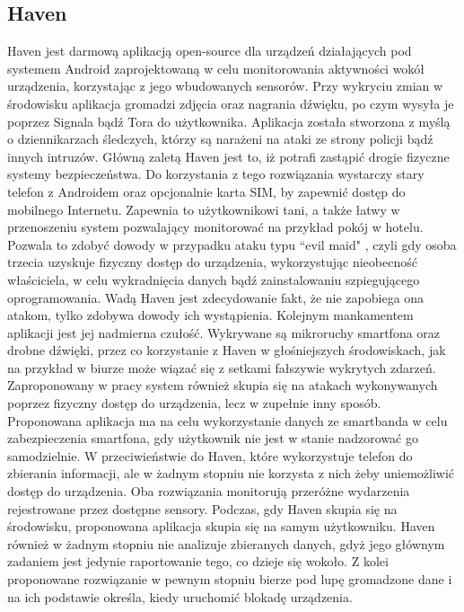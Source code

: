 \subsection{Haven}
Haven \cite{Haven} jest darmową aplikacją open-source dla urządzeń działających pod systemem Android zaprojektowaną w celu monitorowania aktywności wokół urządzenia,
korzystając z jego wbudowanych sensorów. Przy wykryciu zmian w środowisku aplikacja gromadzi zdjęcia oraz nagrania dźwięku, po czym wysyła je poprzez
Signala bądź Tora do użytkownika. Aplikacja została stworzona z myślą o dziennikarzach śledczych, którzy są narażeni na ataki ze strony policji bądź innych
intruzów.
\newline\newline
\indent Główną zaletą Haven jest to, iż potrafi zastąpić drogie fizyczne systemy bezpieczeństwa. Do korzystania z tego rozwiązania wystarczy stary telefon z Androidem oraz opcjonalnie karta SIM, by zapewnić dostęp do mobilnego Internetu. Zapewnia to użytkownikowi tani, a także łatwy w przenoszeniu system pozwalający monitorować na przykład pokój w hotelu. Pozwala to zdobyć dowody w przypadku ataku typu ``evil maid" \cite{Evil-Maid}, czyli gdy osoba trzecia uzyskuje fizyczny dostęp do urządzenia, wykorzystując nieobecność właściciela, w celu wykradnięcia danych bądź zainstalowaniu szpiegującego oprogramowania.
\newline\newline
\indent Wadą Haven jest zdecydowanie fakt, że nie zapobiega ona atakom, tylko zdobywa dowody ich wystąpienia. Kolejnym mankamentem aplikacji jest jej nadmierna czułość. Wykrywane są mikroruchy smartfona oraz drobne dźwięki, przez co korzystanie z Haven w głośniejszych środowiskach, jak na przykład w biurze może wiązać się z setkami fałszywie wykrytych zdarzeń.
\newline\newline
\indent Zaproponowany w pracy system również skupia się na atakach wykonywanych poprzez fizyczny dostęp do urządzenia, lecz w zupełnie inny sposób. Proponowana aplikacja ma na celu wykorzystanie danych ze smartbanda w celu zabezpieczenia smartfona, gdy użytkownik nie jest w stanie nadzorować go samodzielnie. W
przeciwieństwie do Haven, które wykorzystuje telefon do zbierania informacji, ale w żadnym stopniu nie korzysta z nich żeby uniemożliwić dostęp do
urządzenia. Oba rozwiązania monitorują przeróżne wydarzenia rejestrowane przez dostępne sensory. Podczas, gdy Haven skupia się na środowisku,
proponowana aplikacja skupia się na samym użytkowniku. Haven również w żadnym stopniu nie analizuje zbieranych danych, gdyż jego głównym zadaniem jest
jedynie raportowanie tego, co dzieje się wokoło. Z kolei proponowane rozwiązanie w pewnym stopniu bierze pod lupę gromadzone dane i na ich podstawie
określa, kiedy uruchomić blokadę urządzenia.
